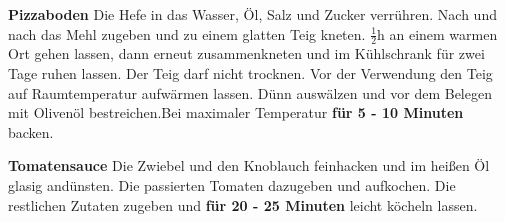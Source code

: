 \vspace*{\fill}
\begin{multicols}{2}

\textbf{Pizzaboden}\newline
Die Hefe in das Wasser, Öl, Salz und Zucker verrühren. Nach und nach das Mehl zugeben und
zu einem glatten Teig kneten.\newline
$\frac{1}{2}$h an einem warmen Ort gehen lassen, dann erneut zusammenkneten und im 
Kühlschrank für zwei Tage ruhen lassen. \newline
Der Teig darf nicht trocknen.\newline
Vor der Verwendung den Teig auf Raumtemperatur aufwärmen lassen.
Dünn auswälzen und vor dem Belegen mit Olivenöl bestreichen.\newline Bei maximaler Temperatur
\textbf{für 5 - 10 Minuten} backen.\newline
\columnbreak

\textbf{Tomatensauce}\newline
Die Zwiebel und den Knoblauch feinhacken und im heißen Öl glasig andünsten. Die passierten Tomaten dazugeben
und aufkochen.\newline
Die restlichen Zutaten zugeben und \textbf{für 20 - 25 Minuten} leicht köcheln lassen.



\end{multicols}
\vfill
